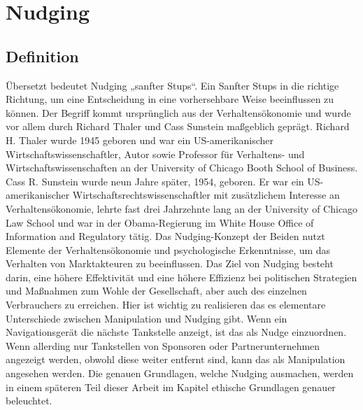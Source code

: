 \chapter{Nudging}
\section{Definition}
Übersetzt bedeutet Nudging „sanfter Stups“. Ein Sanfter Stups in die richtige Richtung, um eine Entscheidung in eine vorhersehbare Weise beeinflussen zu können. 
Der Begriff kommt ursprünglich aus der Verhaltensökonomie und wurde vor allem durch Richard Thaler und Cass Sunstein maßgeblich geprägt. Richard H. Thaler wurde 1945 geboren und war ein US-amerikanischer Wirtschaftswissenschaftler, Autor sowie Professor für Verhaltens- und Wirtschaftswissenschaften an der University of Chicago Booth School of Business. Cass R. Sunstein wurde neun Jahre später, 1954, geboren. Er war ein US-amerikanischer Wirtschaftsrechtswissenschaftler mit zusätzlichem Interesse an Verhaltensökonomie, lehrte fast drei Jahrzehnte lang an der University of Chicago Law School und war in der Obama-Regierung im White House Office of Information and Regulatory tätig.
Das Nudging-Konzept der Beiden nutzt Elemente der Verhaltensökonomie und psychologische Erkenntnisse, um das Verhalten von Marktakteuren zu beeinflussen. \parencite[]{Kenning.2016}
Das Ziel von Nudging besteht darin, eine höhere Effektivität und eine höhere Effizienz bei politischen Strategien und Maßnahmen zum Wohle der Gesellschaft, aber auch des einzelnen Verbrauchers zu erreichen.
Hier ist wichtig zu realisieren das es elementare Unterschiede zwischen Manipulation und Nudging gibt. Wenn ein Navigationsgerät die nächste Tankstelle anzeigt, ist das als Nudge einzuordnen. Wenn allerding nur Tankstellen von Sponsoren oder Partnerunternehmen angezeigt werden, obwohl diese weiter entfernt sind, kann das als Manipulation angesehen werden. \parencite{Hansen.2017} Die genauen Grundlagen, welche Nudging ausmachen, werden in einem späteren Teil dieser Arbeit im Kapitel ethische Grundlagen genauer beleuchtet.